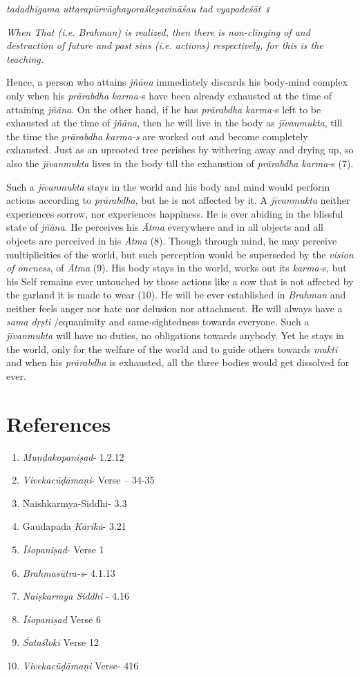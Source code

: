 \emph{tadadhigama uttarapūrvāghayoraśleṣavināśau tad vyapadeśāt ॥}

\emph{When That (i.e. Brahman) is realized, then there is non-clinging of and destruction of future and past sins (i.e. actions) respectively, for this is the teaching.}

Hence, a person who attains \emph{jñāna} immediately discards his body-mind complex only when his \emph{prārabdha} \emph{karma-}s have been already exhausted at the time of attaining \emph{jñāna}. On the other hand, if he has \emph{prārabdha} \emph{karma-}s left to be exhausted at the time of \emph{jñāna}, then he will live in the body as \emph{jīvanmukta}, till the time the \emph{prārabdha} \emph{karma-s} are worked out and become completely exhausted. Just as an uprooted tree perishes by withering away and drying up, so also the \emph{jīvanmukta} lives in the body till the exhaustion of \emph{prārabdha} \emph{karma-}s (7).

Such a \emph{jīvanmukta} stays in the world and his body and mind would perform actions according to \emph{prārabdha}, but he is not affected by it. A \emph{jīvanmukta} neither experiences sorrow, nor experiences happiness. He is ever abiding in the blissful state of \emph{jñāna}. He perceives his \emph{Ātma} everywhere and in all objects and all objects are perceived in his \emph{Ātma} (8). Though through mind, he may perceive multiplicities of the world, but such perception would be superseded by the \emph{vision of oneness}, of \emph{Ātma} (9). His body stays in the world, works out its \emph{karma-}s, but his Self remains ever untouched by those actions like a cow that is not affected by the garland it is made to wear (10). He will be ever established in \emph{Brahman} and neither feels anger nor hate nor delusion nor attachment. He will always have a \emph{sama dṛṣti} /equanimity and same-sightedness towards everyone. Such a \emph{jīvanmukta} will have no duties, no obligations towards anybody. Yet he stays in the world, only for the welfare of the world and to guide others towards \emph{mukti} and when his \emph{prārabdha} is exhausted, all the three bodies would get dissolved for ever.

\section*{References}

\begin{enumerate}
\item
  \emph{Muṇḍakopaniṣad}- 1.2.12
\item
  \emph{Vivekacūḍāmaṇi}- Verse -- 34-35
\item
  Naishkarmya-Siddhi- 3.3
\item
  Gaudapada \emph{Kārikā}- 3.21
\item
  \emph{Īśopaniṣad}- Verse 1
\item
  \emph{Brahmasūtra-s}- 4.1.13
\item
  \emph{Naiṣkarmya Siddhi} - 4.16
\item
  \emph{Īśopaniṣad} Verse 6
\item
  \emph{Śataślokī} Verse 12
\item
  \emph{Vivekacūḍāmaṇi} Verse- 416
\end{enumerate}

